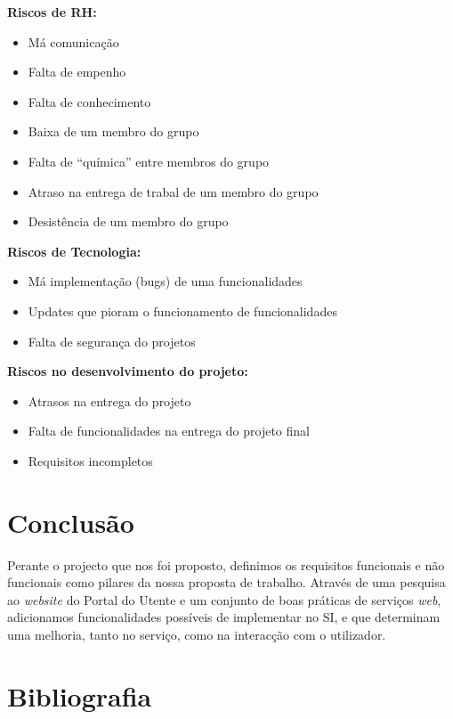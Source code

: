 \documentclass[12pt, a4paper, twoside]{report} %
\begin{document}
\clearpage
\noindent\textbf{Riscos de RH:}
\\
\begin{itemize}
\item Má comunicação
\item Falta de empenho
\item Falta de conhecimento
\item Baixa de um membro do grupo
\item Falta de “química” entre membros do grupo
\item Atraso na entrega de trabal de um membro do grupo
\item Desistência de um membro do grupo
\end{itemize}
\textbf{Riscos de Tecnologia:}
\\
\begin{itemize}
\item Má implementação (bugs) de uma funcionalidades
\item Updates que pioram o funcionamento de funcionalidades
\item Falta de segurança do projetos
\end{itemize}
\textbf{Riscos no desenvolvimento do projeto:}
\\
\begin{itemize}
\item Atrasos na entrega do projeto
\item Falta de funcionalidades na entrega do projeto final
\item Requisitos incompletos
\end{itemize}

\chapter{Conclusão}

Perante o projecto que nos foi proposto, definimos os requisitos funcionais e não funcionais como pilares da nossa proposta de trabalho. 
Através de uma pesquisa ao \textit {website} do Portal do Utente e um conjunto de boas práticas de serviços \textit {web}, adicionamos funcionalidades possíveis de implementar no SI, e que determinam uma melhoria, tanto no serviço, como na interacção com o utilizador.


\chapter{Bibliografia}

\end{document}
